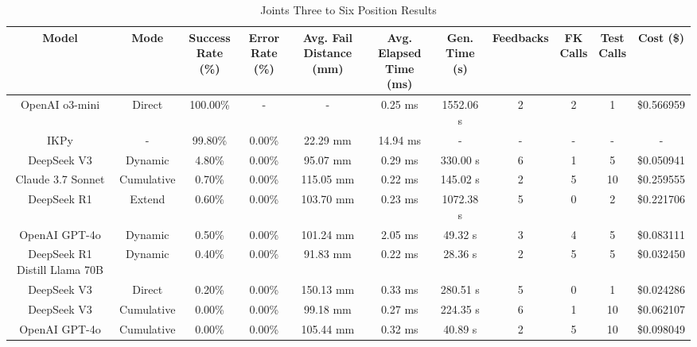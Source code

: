 \begin{landscape}
\begin{table}[H]
\tiny
\renewcommand{\arraystretch}{1.2}
\caption{Joints Three to Six Position Results}
\begin{center}
\begin{tabular}{|c|c|c|c|c|c|c|c|c|c|c|}
    \hline
    \textbf{Model} & 
    \textbf{Mode} & 
    \makecell{\textbf{Success}\\\textbf{Rate (\%)}} &
    \makecell{\textbf{Error}\\\textbf{Rate (\%)}} &
    \makecell{\textbf{Avg. Fail}\\\textbf{Distance (mm)}} &
    \makecell{\textbf{Avg. Elapsed}\\\textbf{Time (ms)}} &
    \makecell{\textbf{Gen.}\\\textbf{Time (s)}} &
    \textbf{Feedbacks} &
    \makecell{\textbf{FK}\\\textbf{Calls}} &
    \makecell{\textbf{Test}\\\textbf{Calls}} &
    \textbf{Cost (\$)} \\
    \hline
    OpenAI o3-mini & Direct & 100.00\% & - & - & 0.25 ms & 1552.06 s & 2 & 2 & 1 & \$0.566959 \\
    \hline
    IKPy & - & 99.80\% & 0.00\% & 22.29 mm & 14.94 ms & - & - & - & - & - \\
    \hline
    DeepSeek V3 & Dynamic & 4.80\% & 0.00\% & 95.07 mm & 0.29 ms & 330.00 s & 6 & 1 & 5 & \$0.050941 \\
    \hline
    Claude 3.7 Sonnet & Cumulative & 0.70\% & 0.00\% & 115.05 mm & 0.22 ms & 145.02 s & 2 & 5 & 10 & \$0.259555 \\
    \hline
    DeepSeek R1 & Extend & 0.60\% & 0.00\% & 103.70 mm & 0.23 ms & 1072.38 s & 5 & 0 & 2 & \$0.221706 \\
    \hline
    OpenAI GPT-4o & Dynamic & 0.50\% & 0.00\% & 101.24 mm & 2.05 ms & 49.32 s & 3 & 4 & 5 & \$0.083111 \\
    \hline
    DeepSeek R1 Distill Llama 70B & Dynamic & 0.40\% & 0.00\% & 91.83 mm & 0.22 ms & 28.36 s & 2 & 5 & 5 & \$0.032450 \\
    \hline
    DeepSeek V3 & Direct & 0.20\% & 0.00\% & 150.13 mm & 0.33 ms & 280.51 s & 5 & 0 & 1 & \$0.024286 \\
    \hline
    DeepSeek V3 & Cumulative & 0.00\% & 0.00\% & 99.18 mm & 0.27 ms & 224.35 s & 6 & 1 & 10 & \$0.062107 \\
    \hline
    OpenAI GPT-4o & Cumulative & 0.00\% & 0.00\% & 105.44 mm & 0.32 ms & 40.89 s & 2 & 5 & 10 & \$0.098049 \\

\end{tabular}
\end{center}
\end{table}
\end{landscape}
